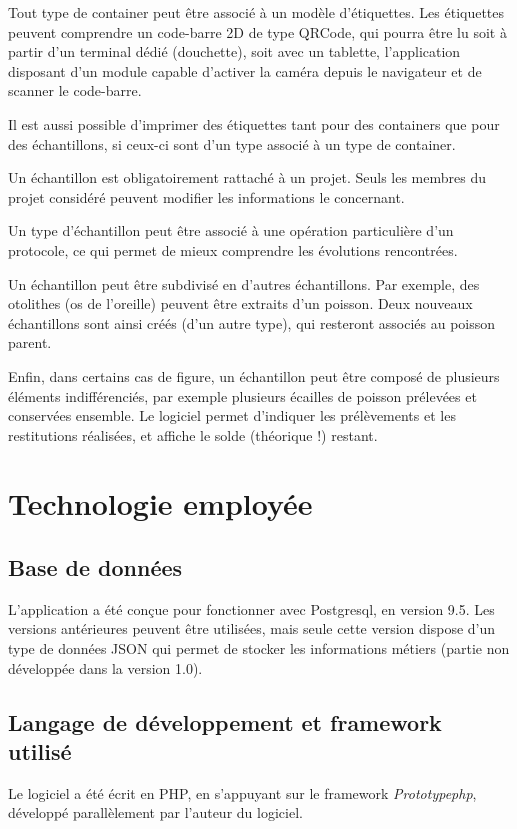 Tout type de container peut être associé à un modèle d'étiquettes. Les étiquettes peuvent comprendre un code-barre 2D de type QRCode, qui pourra être lu soit à partir d'un terminal dédié (douchette), soit avec un tablette, l'application disposant d'un module capable d'activer la caméra depuis le navigateur et de scanner le code-barre.

Il est aussi possible d'imprimer des étiquettes tant pour des containers que pour des échantillons, si ceux-ci sont d'un type associé à un type de container.

Un échantillon est obligatoirement rattaché à un projet. Seuls les membres du projet considéré peuvent modifier les informations le concernant. 

Un type d'échantillon peut être associé à une opération particulière d'un protocole, ce qui permet de mieux comprendre les évolutions rencontrées.

Un échantillon peut être subdivisé en d'autres échantillons. Par exemple, des otolithes (os de l'oreille) peuvent être extraits d'un poisson. Deux nouveaux échantillons sont ainsi créés (d'un autre type), qui resteront associés au poisson parent.

Enfin, dans certains cas de figure, un échantillon peut être composé de plusieurs éléments indifférenciés, par exemple plusieurs écailles de poisson prélevées et conservées ensemble. Le logiciel permet d'indiquer les prélèvements et les restitutions réalisées, et affiche le solde (théorique !) restant.

\section{Technologie employée}
\subsection{Base de données}

L'application a été conçue pour fonctionner avec Postgresql, en version 9.5. Les versions antérieures peuvent être utilisées, mais seule cette version dispose d'un type de données JSON qui permet de stocker les informations métiers (partie non  développée dans la version 1.0).

\subsection{Langage de développement et framework utilisé}
Le logiciel a été écrit en PHP, en s'appuyant sur le framework \textit{Prototypephp}, développé parallèlement par l'auteur du logiciel.

